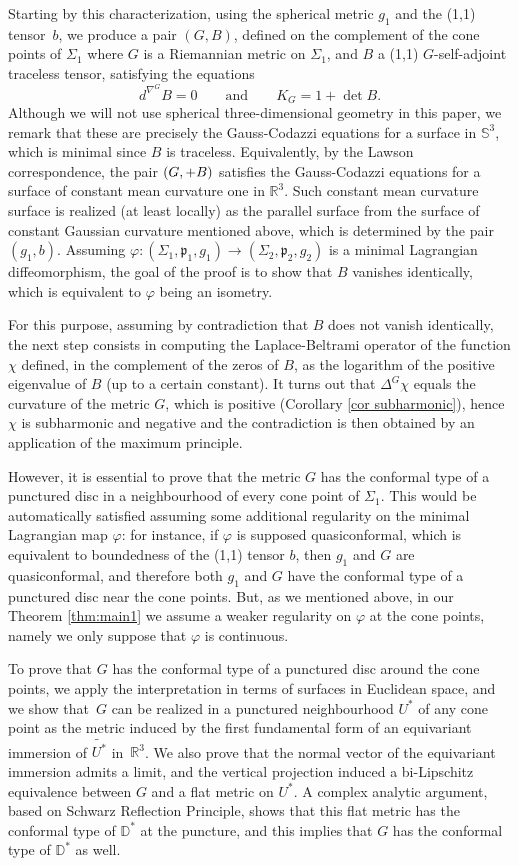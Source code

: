 \documentclass[11pt]{article}
\makeatletter
\DeclareRobustCommand{\mathbbm}[1]{\csname jepbb@#1\endcsname}
\theoremstyle{definition}
\newcommand{\R}{{\mathbb R}}
\makeatother
\begin{document}
Starting by this characterization, using the spherical metric $g_1$ and the (1,1) tensor~$b$, we produce a pair $(G,B)$, {defined on the complement of the cone points of $\Sigma_1$} where $G$ is a Riemannian metric on $\Sigma_1$, and $B$ a (1,1) $G$-self-adjoint traceless tensor, satisfying the equations
\[
d^{\nabla^G}\!\!B=0\qquad\text{and}\qquad K_G=1+\det B.
\]
Although we will not use spherical three-dimensional geometry in this paper, we remark that these are precisely the Gauss-Codazzi equations for a surface in $\mathbb S^3$, which is minimal since $B$ is traceless. Equivalently, by the Lawson correspondence, the pair $(G,\mathbbm 1+B)$ satisfies the Gauss-Codazzi equations for a surface of constant mean curvature one in $\R^3$. Such constant mean curvature surface is realized (at least locally) as the parallel surface from the surface of constant Gaussian curvature mentioned above, which is determined by the pair $(g_1,b)$.
Assuming $\varphi:(\Sigma_1,\mathfrak p_1,g_1)\to(\Sigma_2,\mathfrak p_2,g_2)$ is a minimal Lagrangian diffeomorphism, the goal of the proof is to show that $B$ vanishes identically, which is equivalent to $\varphi$ being an isometry.

For this purpose, assuming by contradiction that $B$ does not vanish identically, the next step consists in computing the Laplace-Beltrami operator of the function $\chi$ defined, in the complement of the zeros of $B$, as the logarithm of the positive eigenvalue of $B$ (up to a certain constant). It turns out that $\Delta^G\chi$ equals the curvature of the metric $G$, which is positive (Corollary \ref{cor subharmonic}), hence $\chi$ is subharmonic and negative and the contradiction is then obtained by an application of the maximum principle.

However, it is essential to prove that the metric $G$ has the conformal type of a punctured disc in a neighbourhood of every cone point of $\Sigma_1$. This would be automatically satisfied assuming some additional regularity on the minimal Lagrangian map $\varphi$: for instance, if $\varphi$ is supposed quasiconformal, which is equivalent to boundedness of the (1,1) tensor $b$, then $g_1$ and $G$ are quasiconformal, and therefore both $g_1$ and $G$ have the conformal type of a punctured disc near the cone points.
But, as we mentioned above, in our Theorem \ref{thm:main1} we assume a weaker regularity on $\varphi$ at the cone points, namely we only suppose that $\varphi$ is continuous.

To prove that $G$ has the conformal type of a punctured disc around the cone points, we apply the interpretation in terms of surfaces in Euclidean space, and we show that~$G$ can be realized in a punctured neighbourhood $U^*$ of any cone point as the metric induced by the first fundamental form of an equivariant immersion of $\widetilde{U^*}$ in~$\R^3$. We also prove that the normal vector of the equivariant immersion admits a limit, and the vertical projection induced a bi-Lipschitz equivalence between $G$ and a flat metric on $U^*$. A complex analytic argument, based on Schwarz Reflection Principle, shows that this flat metric has the conformal type of $\mathbb D^*$ at the puncture, and this implies that $G$ has the conformal type of $\mathbb D^*$ as well.
\end{document}
